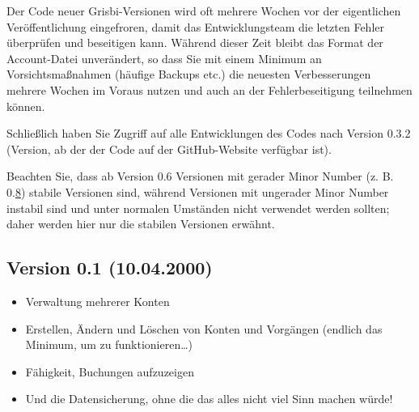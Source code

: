 Der Code neuer Grisbi-Versionen wird oft mehrere Wochen vor der eigentlichen Veröffentlichung eingefroren, damit das Entwicklungsteam die letzten Fehler überprüfen und beseitigen kann. Während dieser Zeit bleibt das Format der Account-Datei unverändert, so dass Sie mit einem Minimum an Vorsichtsmaßnahmen (häufige Backups etc.) die neuesten Verbesserungen mehrere Wochen im Voraus nutzen und auch an der Fehlerbeseitigung teilnehmen können.

Schließlich haben Sie Zugriff auf alle Entwicklungen des Codes nach Version 0.3.2 (Version, ab der der Code auf der \gls{GitHub}-Website verfügbar ist).

Beachten Sie, dass ab Version 0.6 Versionen mit gerader Minor Number (z. B. 0.\underline8) stabile Versionen sind, während Versionen mit ungerader Minor Number instabil sind und unter normalen Umständen nicht verwendet werden sollten; daher werden hier nur die stabilen Versionen erwähnt.


\subsection{Version 0.1 \textnormal{(10.04.2000)}}

\begin{itemize}
	\item Verwaltung mehrerer Konten%
	\item Erstellen, Ändern und Löschen von Konten und Vorgängen (endlich das Minimum, um zu funktionieren\dots{})%
	\item Fähigkeit, Buchungen aufzuzeigen%
	\item Und die Datensicherung, ohne die das alles nicht viel Sinn machen würde!%
\end{itemize}


